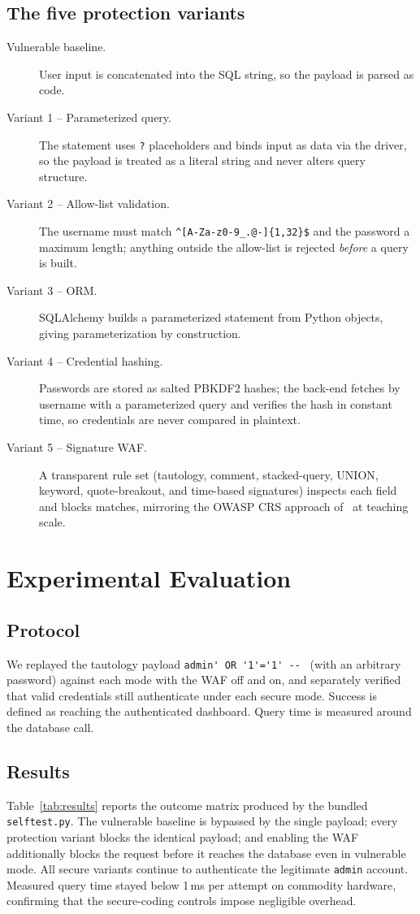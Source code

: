 \documentclass[pdflatex,sn-mathphys-num]{sn-jnl}
\begin{document}
\subsection{The five protection variants}
\begin{description}
\item[Vulnerable baseline.] User input is concatenated into the SQL string, so the
payload is parsed as code.
\item[Variant 1 -- Parameterized query.] The statement uses \verb|?| placeholders and
binds input as data via the driver, so the payload is treated as a literal string and
never alters query structure.
\item[Variant 2 -- Allow-list validation.] The username must match
\lstinline|^[A-Za-z0-9_.@-]{1,32}$| and the password a maximum length; anything outside
the allow-list is rejected \emph{before} a query is built.
\item[Variant 3 -- ORM.] SQLAlchemy builds a parameterized statement from Python
objects, giving parameterization by construction.
\item[Variant 4 -- Credential hashing.] Passwords are stored as salted PBKDF2 hashes;
the back-end fetches by username with a parameterized query and verifies the hash in
constant time, so credentials are never compared in plaintext.
\item[Variant 5 -- Signature WAF.] A transparent rule set (tautology, comment,
stacked-query, UNION, keyword, quote-breakout, and time-based signatures) inspects each
field and blocks matches, mirroring the OWASP CRS approach of~\cite{alotaibi2023sdnwaf,floris2025modsec}
at teaching scale.
\end{description}

\section{Experimental Evaluation}\label{sec:eval}

\subsection{Protocol}
We replayed the tautology payload \lstinline|admin' OR '1'='1' -- | (with an arbitrary
password) against each mode with the WAF off and on, and separately verified that valid
credentials still authenticate under each secure mode. Success is defined as reaching
the authenticated dashboard. Query time is measured around the database call.

\subsection{Results}
Table~\ref{tab:results} reports the outcome matrix produced by the bundled
\texttt{selftest.py}. The vulnerable baseline is bypassed by the single payload; every
protection variant blocks the identical payload; and enabling the WAF additionally
blocks the request before it reaches the database even in vulnerable mode. All secure
variants continue to authenticate the legitimate \texttt{admin} account. Measured query
time stayed below 1\,ms per attempt on commodity hardware, confirming that the
secure-coding controls impose negligible overhead.
\end{document}
